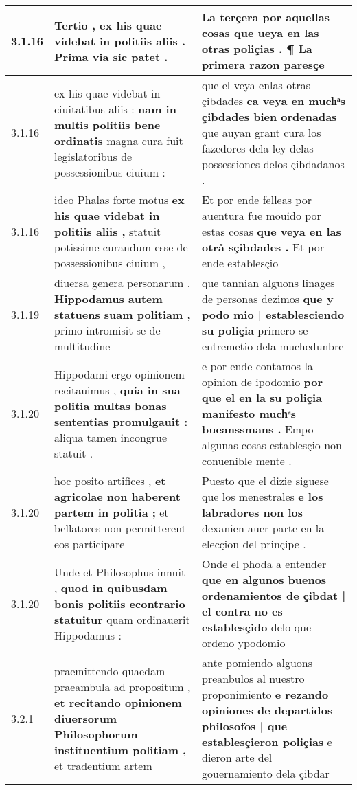 \begin{tabular}{|p{1cm}|p{6.5cm}|p{6.5cm}|}
3.1.16 & Tertio , ex his quae videbat \textbf{ in politiis aliis . } Prima via sic patet . & La terçera por aquellas cosas \textbf{ que ueya en las otras poliçias . } ¶ La primera razon paresçe \\\hline
3.1.16 & ex his quae videbat in ciuitatibus aliis : \textbf{ nam in multis politiis bene ordinatis } magna cura fuit legislatoribus de possessionibus ciuium : & que el veya enlas otras çibdades \textbf{ ca veya en muchͣs çibdades bien ordenadas } que auyan grant cura los fazedores dela ley delas possessiones delos çibdadanos . \\\hline
3.1.16 & ideo Phalas forte motus \textbf{ ex his quae videbat in politiis aliis , } statuit potissime curandum esse de possessionibus ciuium , & Et por ende felleas por auentura fue mouido por estas cosas \textbf{ que veya en las otrå sçibdades . } Et por ende establesçio \\\hline
3.1.19 & diuersa genera personarum . \textbf{ Hippodamus autem statuens suam politiam , } primo intromisit se de multitudine & que tannian alguons linages de personas dezimos \textbf{ que y podo mio | establesciendo su poliçia } primero se entremetio dela muchedunbre \\\hline
3.1.20 & Hippodami ergo opinionem recitauimus , \textbf{ quia in sua politia multas bonas sententias promulgauit : } aliqua tamen incongrue statuit . & e por ende contamos la opinion de ipodomio \textbf{ por que el en la su poliçia manifesto muchͣs bueanssmans . } Empo algunas cosas establesçio non conuenible mente . \\\hline
3.1.20 & hoc posito artifices , \textbf{ et agricolae non haberent partem in politia ; } et bellatores non permitterent eos participare & Puesto que el dizie siguese que los menestrales \textbf{ e los labradores non los } dexanien auer parte en la elecçion del prinçipe . \\\hline
3.1.20 & Unde et Philosophus innuit , \textbf{ quod in quibusdam bonis politiis econtrario statuitur } quam ordinauerit Hippodamus : & Onde el phoda a entender \textbf{ que en algunos buenos ordenamientos de çibdat | el contra no es establesçido } delo que ordeno ypodomio \\\hline
3.2.1 & praemittendo quaedam praeambula ad propositum , \textbf{ et recitando opinionem diuersorum Philosophorum instituentium politiam , } et tradentium artem & ante pomiendo alguons preanbulos al nuestro proponimiento \textbf{ e rezando opiniones de departidos philosofos | que establesçieron poliçias } e dieron arte del gouernamiento dela çibdar \\\hline

\end{tabular}
